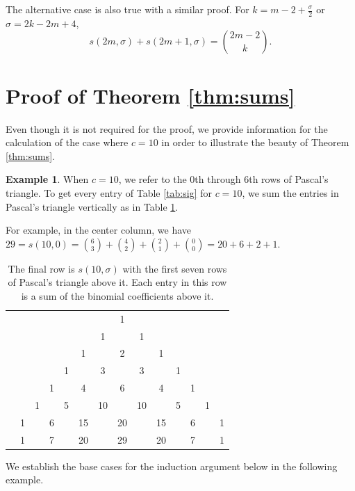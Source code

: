 \documentclass[11pt]{amsart}
\theoremstyle{definition}
\newtheorem{example}[theorem]{Example}
\theoremstyle{remark}
\numberwithin{equation}{section}
\begin{document}
The alternative case is also true with a similar proof.  For $k=m-2+\frac{\sigma}{2}$ or $\sigma=2k-2m+4$,
\[s(2m,\sigma) + s(2m+1,\sigma) = \binom{2m-2}{k}.\]




\section{Proof of Theorem \ref{thm:sums}}
\label{sec:sums}

Even though it is not required for the proof, we provide information for the calculation of the case where $c=10$ in order to illustrate the beauty of Theorem \ref{thm:sums}.


\begin{example}
    \label{ex:10}
When $c=10$, we refer to the 0th through 6th rows of Pascal's triangle.  To get every entry of Table \ref{tab:sig} for $c=10$, we sum the entries in Pascal's triangle vertically as in Table \ref{tab:pascal}.

For example,  in the center column, we have   $29=s(10,0)=\binom{6}{3}+\binom{4}{2}+\binom{2}{1}+\binom{0}{0}=20+6+2+1$.
\end{example}



\begin{table}[h!]
\begin{tabular}{ccccccc|c|cccccc}
 &   &   &   &  &  &  & 1 &  &  &  &  &  &  \\
 &   &   &   &  &  & 1 &   & 1 &  &  &  &  &  \\
 &   &   &   &  & 1 &  & 2 &  & 1 &  &  &  &  \\
 &  &  &  &  1 &  & 3 &  & 3 &  & 1  &  &  &  \\
 &  &  & 1 &  & 4 &  & 6 &  & 4 &  & 1 &  &  \\
 &  & 1 &  & 5 &  & 10 &  & 10 &  & 5 &  & 1 &  \\
 & 1 &  & 6 &  & 15 &  & 20 &  & 15 &  & 6 &  &  1 \\
 \hline
  & 1 &  & 7 &  & 20 &  & 29 &  & 20 &  & 7 &  &  1 
\end{tabular}
\caption{\label{tab:pascal} The final row is $s(10,\sigma)$ with the first seven rows of Pascal's triangle above it.  Each entry in this row is a sum of the binomial coefficients above it.}
\end{table}


We establish the base cases for the induction argument below in the following example.
\end{document}
